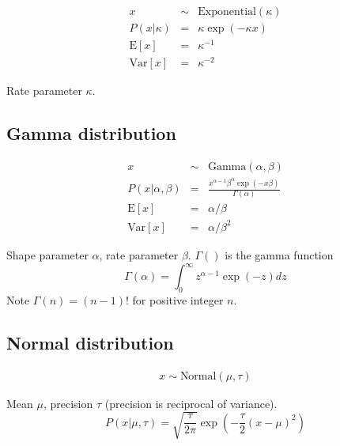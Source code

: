 \documentclass[10pt]{article}
\begin{document}
\begin{eqnarray*}
x & \sim & \mbox{Exponential}(\kappa) \\
P(x|\kappa) & = & \kappa \exp(-\kappa x) \\
\mbox{E}[x] & = & \kappa^{-1} \\
\mbox{Var}[x] & = & \kappa^{-2}
\end{eqnarray*}

Rate parameter $\kappa$.


\subsection{Gamma distribution}

\begin{eqnarray*}
x & \sim & \mbox{Gamma}(\alpha,\beta) \\
P(x|\alpha,\beta) & = & \frac{x^{\alpha-1} \beta^\alpha \exp(-x \beta)}{\Gamma(\alpha)} \\
\mbox{E}[x] & = & \alpha/\beta \\
\mbox{Var}[x] & = & \alpha/\beta^2
\end{eqnarray*}

Shape parameter $\alpha$, rate parameter $\beta$.
$\Gamma()$ is the gamma function
\[
\Gamma(\alpha) = \int_0^{\infty} z^{\alpha-1} \exp(-z) dz
\]
Note $\Gamma(n) = (n-1)!$ for positive integer $n$.

\subsection{Normal distribution}

\begin{eqnarray*}
x \sim \mbox{Normal}(\mu,\tau)
\end{eqnarray*}


Mean $\mu$, precision $\tau$ (precision is reciprocal of variance).
\[
P(x|\mu,\tau)
 = \sqrt{\frac{\tau}{2\pi}} \exp \left( -\frac{\tau}{2}(x-\mu)^2 \right)
\]
\end{document}
